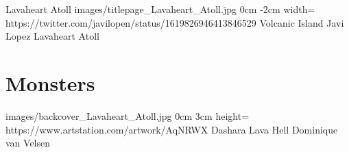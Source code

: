 \documentclass[letterpaper,openany,twoside,twocolumn]{book}
\begin{document}
	\regionTitlePage
		{Lavaheart Atoll}
		{images/titlepage_Lavaheart_Atoll.jpg}
		{0cm}
		{-2cm}
		{width=\paperwidth}
		{https://twitter.com/javilopen/status/1619826946413846529}
		{Volcanic Island}
		{Javi Lopez}
		{Lavaheart Atoll}
	
	\tableofcontents
	
	\mainmatter
	
	\MonsterSheetGeometry
	\part{Monsters}
	
	
	\regionLastPage
		{images/backcover_Lavaheart_Atoll.jpg}
		{0cm}
		{3cm}
		{height=\paperheight}
		{https://www.artstation.com/artwork/AqNRWX}
		{Dashara Lava Hell}
		{Dominique van Velsen}
		{}
\end{document}
